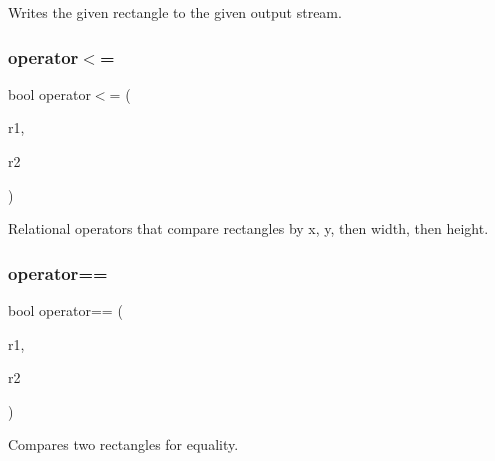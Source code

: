 Writes the given rectangle to the given output stream. 

\mbox{\label{structsgl_1_1GRectangle_a3588a1e1157026c5ef8c0ed41ba78890}} 
\subsubsection{\texorpdfstring{operator$<$=}{operator<=}}
{\footnotesize\ttfamily bool operator$<$= (\begin{DoxyParamCaption}\item[{const \mbox{\hyperlink{structsgl_1_1GRectangle}{G\+Rectangle}} \&}]{r1,  }\item[{const \mbox{\hyperlink{structsgl_1_1GRectangle}{G\+Rectangle}} \&}]{r2 }\end{DoxyParamCaption})\hspace{0.3cm}{\ttfamily [friend]}}



Relational operators that compare rectangles by x, y, then width, then height. 

\mbox{\label{structsgl_1_1GRectangle_a83a32754b7097b7c484607635114ce5e}} 
\subsubsection{\texorpdfstring{operator==}{operator==}}
{\footnotesize\ttfamily bool operator== (\begin{DoxyParamCaption}\item[{const \mbox{\hyperlink{structsgl_1_1GRectangle}{G\+Rectangle}} \&}]{r1,  }\item[{const \mbox{\hyperlink{structsgl_1_1GRectangle}{G\+Rectangle}} \&}]{r2 }\end{DoxyParamCaption})\hspace{0.3cm}{\ttfamily [friend]}}



Compares two rectangles for equality. 

\mbox{\label{structsgl_1_1GRectangle_a99b0e23f34dced98f43fd0250c9cdf40}} 
